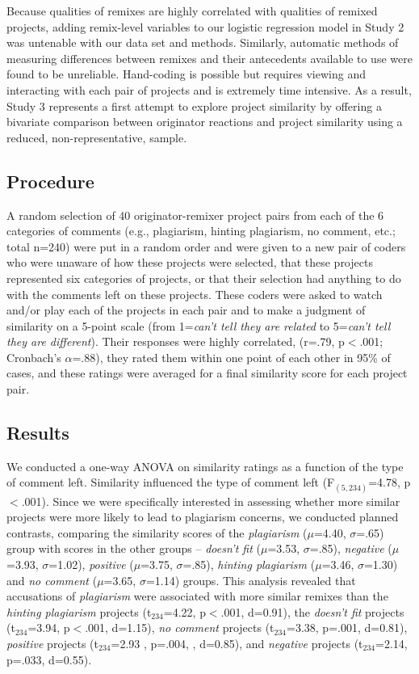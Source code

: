 Because qualities of remixes are highly correlated with qualities of
remixed projects, adding remix-level variables to our logistic
regression model in Study 2 was untenable with our data set and
methods.  Similarly, automatic methods of measuring differences between
remixes and their antecedents available to use were found to be unreliable.
Hand-coding is possible but requires viewing and interacting with each
pair of projects and is extremely time intensive. As a result, Study 3
represents a first attempt to explore project similarity by offering a
bivariate comparison between originator reactions and project similarity
using a reduced, non-representative, sample.

\subsection{Procedure}

A random selection of 40 originator-remixer project pairs from each of
the 6 categories of comments (e.g., plagiarism, hinting plagiarism, no
comment, etc.; total n=240) were put in a random order and were given to
a new pair of coders who were unaware of how these projects were
selected, that these projects represented six categories of projects, or
that their selection had anything to do with the comments left on these
projects. These coders were asked to watch and/or play each of the
projects in each pair and to make a judgment of similarity on a 5-point
scale (from 1={\em can't tell they are related} to 5={\em can't tell
they are different}). Their responses were highly correlated,
(r=.79, p$<$.001; Cronbach's $\alpha$=.88), they rated them within
one point of each other in 95\% of cases, and these ratings were
averaged for a final similarity score for each project pair.

\subsection{Results}

We conducted a one-way ANOVA on similarity ratings as a function of the
type of comment left. Similarity influenced the type of comment left
(F$_{(5,234)}$=4.78, p$<$.001).  Since we were specifically interested
in assessing whether more similar projects were more likely to lead to
plagiarism concerns, we conducted planned contrasts,  comparing the similarity scores of the {\em
plagiarism} ($\mu$=4.40, $\sigma$=.65) group with scores in the other
groups -- {\em doesn't fit} ($\mu$=3.53, $\sigma$=.85), {\em negative}
($\mu$=3.93, $\sigma$=1.02), {\em positive} ($\mu$=3.75, $\sigma$=.85),
{\em hinting plagiarism} ($\mu$=3.46, $\sigma$=1.30) and {\em no
comment} ($\mu$=3.65, $\sigma$=1.14) groups. This analysis revealed that
accusations of {\em plagiarism} were associated with more similar
remixes than the {\em hinting plagiarism} projects (t$_{234}$=4.22,
p$<$.001, d=0.91), the {\em doesn't fit}  projects (t$_{234}$=3.94, p$<$.001, d=1.15),
{\em no comment} projects (t$_{234}$=3.38, p=.001, d=0.81), {\em positive}
projects (t$_{234}$=2.93 , p=.004, , d=0.85), and  {\em negative} projects
(t$_{234}$=2.14, p=.033, d=0.55).

